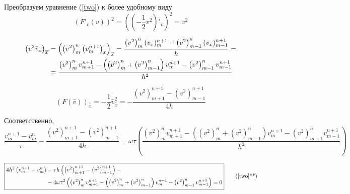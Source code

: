Преобразуем уравнение (\ref{two}) к более удобному виду
\[
\left(F'_v(v)\right)^2 = \left(\left(-\frac{1}{2}v^2\right)'_v \right)^2 = v^2	
\]

\begin{equation} \notag
\begin{split}
\left(v^2\hat{v}_x\right)_{\overline{x}} &= 
\left(\left(v^2\right)_{m}^{n}\left(v_{m}^{n+1}\right)_x\right)_{\overline{x}} = 
\frac{\left(v^2\right)_{m}^{n}(v_x)_{m}^{n+1} - \left(v^2\right)_{m-1}^{n}(v_x)_{m-1}^{n+1}}{h} = \\ 
&= \frac{\left(v^2\right)_{m}^{n}v_{m+1}^{n+1} 
- \left(\left(v^2\right)_{m}^{n} + \left(v^2\right)_{m-1}^{n}\right)v_{m}^{n+1} 
- \left(v^2\right)_{m-1}^{n}v_{m-1}^{n+1}}{h^2} 
\end{split}
\end{equation}

\[
(F(\hat{v}))_{ \overset{\circ}{x} } = 
-\frac{1}{2}\hat{v}_{ \overset{\circ}{x}}^2 =
-\frac{\left(v^2\right)_{m+1}^{n+1} - \left(v^2\right)_{m-1}^{n+1}}{4h}
\]

Соответственно,
\[
\frac{v_{m}^{n+1} - v_m^n}{\tau}  -\frac{\left(v^2\right)_{m+1}^{n+1} - \left(v^2\right)_{m-1}^{n+1}}{4h} = \omega \tau \left(\frac{\left(v^2\right)_{m}^{n}v_{m+1}^{n+1} 
- \left(\left(v^2\right)_{m}^{n} + \left(v^2\right)_{m-1}^{n}\right)v_{m}^{n+1} 
- \left(v^2\right)_{m-1}^{n}v_{m-1}^{n+1}}{h^2}  
\right)
\]

\begin{equation} \label{two2}
\boxed{
\begin{split}
4h^2\left( v_{m}^{n+1} - v_m^n \right) &-
\tau h\left(\left(v^2\right)_{m+1}^{n+1} - \left(v^2\right)_{m-1}^{n+1}\right) - \\
&- 4 \omega \tau^2 \left(\left(v^2\right)_{m}^{n}v_{m+1}^{n+1} 
- \left(\left(v^2\right)_{m}^{n} + \left(v^2\right)_{m-1}^{n}\right)v_{m}^{n+1} 
- \left(v^2\right)_{m-1}^{n}v_{m-1}^{n+1}\right)
 = 0
\end{split}
}
\tag{\ref{two}**}
\end{equation}
